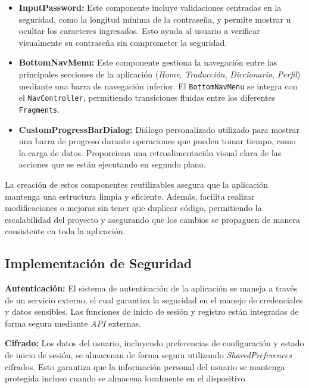 \begin{itemize}
    \item \textbf{InputPassword:} Este componente incluye validaciones centradas en la seguridad, como la longitud mínima de la contraseña, y permite mostrar u ocultar los caracteres ingresados. Esto ayuda al usuario a verificar visualmente su contraseña sin comprometer la seguridad.

    \item \textbf{BottomNavMenu:} Este componente gestiona la navegación entre las principales secciones de la aplicación (\textit{Home}, \textit{Traducción}, \textit{Diccionario}, \textit{Perfil}) mediante una barra de navegación inferior. El \texttt{BottomNavMenu} se integra con el \texttt{NavController}, permitiendo transiciones fluidas entre los diferentes \texttt{Fragments}.

    \item \textbf{CustomProgressBarDialog:} Diálogo personalizado utilizado para mostrar una barra de progreso durante operaciones que pueden tomar tiempo, como la carga de datos. Proporciona una retroalimentación visual clara de las acciones que se están ejecutando en segundo plano.
\end{itemize}

La creación de estos componentes reutilizables asegura que la aplicación mantenga una estructura limpia y eficiente. Además, facilita realizar modificaciones o mejoras sin tener que duplicar código, permitiendo la escalabilidad del proyecto y asegurando que los cambios se propaguen de manera consistente en toda la aplicación.



\subsection{Implementación de Seguridad}

\textbf{Autenticación:} El sistema de autenticación de la aplicación se maneja a través de un servicio externo, el cual garantiza la seguridad en el manejo de credenciales y datos sensibles. Las funciones de inicio de sesión y registro están integradas de forma segura mediante \textit{API} externas.

\textbf{Cifrado:} Los datos del usuario, incluyendo preferencias de configuración y estado de inicio de sesión, se almacenan de forma segura utilizando \textit{SharedPreferences} cifrados. Esto garantiza que la información personal del usuario se mantenga protegida incluso cuando se almacena localmente en el dispositivo.

